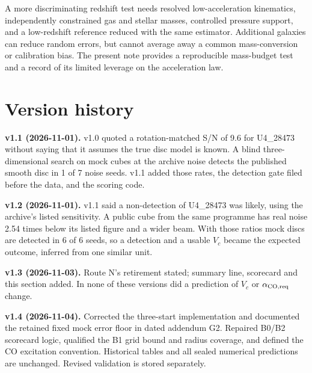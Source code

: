 \documentclass[10pt]{article}
\begin{document}
\begin{samepage}
A more discriminating redshift test needs resolved low-acceleration kinematics, independently constrained gas and stellar masses, controlled pressure support, and a low-redshift reference reduced with the same estimator. Additional galaxies can reduce random errors, but cannot average away a common mass-conversion or calibration bias. The present note provides a reproducible mass-budget test and a record of its limited leverage on the acceleration law.
\par
\end{samepage}

\section{Version history}\label{s:hist}
\textbf{v1.1 (2026-11-01).} v1.0 quoted a rotation-matched S/N of 9.6 for U4\_28473 without saying that it assumes the true disc model is known. A blind three-dimensional search on mock cubes at the archive noise detects the published smooth disc in 1 of 7 noise seeds. v1.1 added those rates, the detection gate filed before the data, and the scoring code.

\textbf{v1.2 (2026-11-01).} v1.1 said a non-detection of U4\_28473 was likely, using the archive's listed sensitivity. A public cube from the same programme has real noise 2.54 times below its listed figure and a wider beam. With those ratios mock discs are detected in 6 of 6 seeds, so a detection and a usable $V_c$ became the expected outcome, inferred from one similar unit.

\textbf{v1.3 (2026-11-03).} Route N's retirement stated; summary line, scorecard and this section added. In none of these versions did a prediction of $V_c$ or $\alpha_{\rm CO,req}$ change.

\textbf{v1.4 (2026-11-04).} Corrected the three-start implementation and documented the retained fixed mock error floor in dated addendum G2. Repaired B0/B2 scorecard logic, qualified the B1 grid bound and radius coverage, and defined the CO excitation convention. Historical tables and all sealed numerical predictions are unchanged. Revised validation is stored separately.
\end{document}
